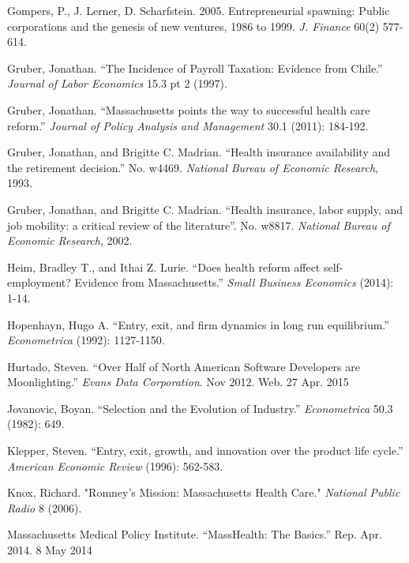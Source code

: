 \documentclass[12pt]{article}
\begin{document}
\begin{thebibliography}{99}
Gompers, P., J. Lerner, D. Scharfstein. 2005. Entrepreneurial spawning: Public corporations and the genesis of new ventures, 1986 to 1999. \emph{J. Finance} 60(2) 577-614.

Gruber, Jonathan. ``The Incidence of Payroll Taxation: Evidence from Chile.'' \emph{Journal of Labor Economics} 15.3 pt 2 (1997).


Gruber, Jonathan. ``Massachusetts points the way to successful health care reform.'' \emph{Journal of Policy Analysis and Management} 30.1 (2011): 184-192.
        
Gruber, Jonathan, and Brigitte C. Madrian. ``Health insurance availability and the retirement decision.'' No. w4469. \emph{National Bureau of Economic Research}, 1993.
        
Gruber, Jonathan, and Brigitte C. Madrian. ``Health insurance, labor supply, and job mobility: a critical review of the literature''. No. w8817. \emph{National Bureau of Economic Research}, 2002.      
        
Heim, Bradley T., and Ithai Z. Lurie. ``Does health reform affect self-employment? Evidence from Massachusetts.'' \emph{Small Business Economics} (2014): 1-14.

Hopenhayn, Hugo A. ``Entry, exit, and firm dynamics in long run equilibrium.'' \emph{Econometrica} (1992): 1127-1150.

Hurtado, Steven. ``Over Half of North American Software Developers are Moonlighting.'' \emph{Evans Data Corporation}. Nov 2012. Web. 27 Apr. 2015

Jovanovic, Boyan. ``Selection and the Evolution of Industry.'' \emph{Econometrica} 50.3 (1982): 649.

Klepper, Steven. ``Entry, exit, growth, and innovation over the product life cycle.'' \emph{American Economic Review} (1996): 562-583.

Knox, Richard. "Romney’s Mission: Massachusetts Health Care." \emph{National Public Radio} 8 (2006).

Massachusetts Medical Policy Institute. ``MassHealth: The Basics.'' Rep. Apr. 2014. 8 May 2014 


\begin{comment}




\end{comment}
\end{thebibliography}
\end{document}
